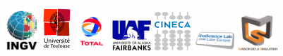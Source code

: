 \begin{figure}[htbp]
\begin{centering}
\includegraphics[width=0.109\textwidth]{figures/logo_INGV.jpg}\vspace*{2truemm}
\includegraphics[width=0.102\textwidth]{figures/logo_Univ_Toulouse.jpg}\vspace*{2truemm}
\includegraphics[width=0.112\textwidth]{figures/logo_TOTAL.jpg}\vspace*{2truemm}
\includegraphics[width=0.130\textwidth]{figures/logo_Fairbanks.jpg}\vspace*{2truemm}
\includegraphics[width=0.120\textwidth]{figures/logo_CINECA.jpg}\vspace*{2truemm}
\includegraphics[width=0.140\textwidth]{figures/logo_Intel_Exascale_Labs.png}\vspace*{2truemm}
\includegraphics[width=0.130\textwidth]{figures/logo_Maison_Simulation.jpg}
\par\end{centering}
\end{figure}

